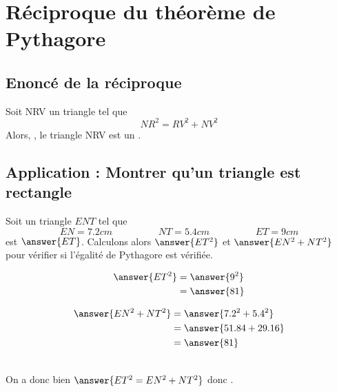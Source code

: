 \section{Réciproque du théorème de Pythagore}
\subsection{Enoncé de la réciproque}
\begin{theoremebox}
    Soit NRV un triangle tel que
    $$NR^2=RV^2+NV^2$$
    Alors, , le triangle NRV
    est un .
\end{theoremebox}

\subsection{Application : Montrer qu'un triangle est rectangle}
\begin{exemplebox}
    Soit un triangle $ENT$ tel que 
    $$EN=7.2cm\hspace{2cm}NT=5.4cm\hspace{2cm}ET=9cm$$
     est $\answer{ET}$. Calculons alors $\answer{ET^2}$ 
    et $\answer{EN^2+NT^2}$ pour vérifier si l'égalité de Pythagore est vérifiée.\\
    \begin{minipage}{0.48\textwidth}
        \begin{align*}
            \answer{ET^2}&=\answer{9^2}\\
            &=\answer{81}\\
        \end{align*}
    \end{minipage}
    \hfill
    \begin{minipage}{0.48\textwidth}
        \begin{align*}
            \answer{EN^2+NT^2}&=\answer{7.2^2+5.4^2}\\
            &=\answer{51.84 + 29.16}\\
            &=\answer{81}\\
        \end{align*}
    \end{minipage}\\
    On a donc bien $\answer{ET^2=EN^2+NT^2}$ donc .
\end{exemplebox}











